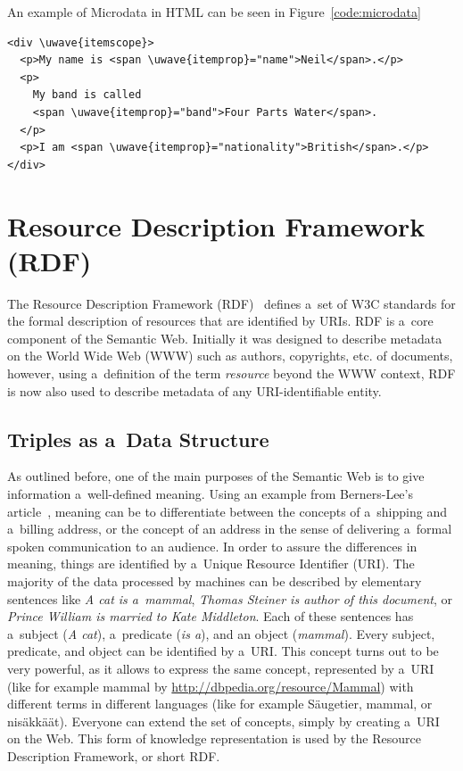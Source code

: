 An example of Microdata in HTML can be seen in Figure~\ref{code:microdata}

\begin{lstlisting}[caption={[Sample code snippet with \uwave{Microdata} mark-up.]{Sample code snippet with Microdata mark-up. Source: \url{http://www.w3.org/TR/microdata/}}},label={code:microdata}]
<div \uwave{itemscope}>
  <p>My name is <span \uwave{itemprop}="name">Neil</span>.</p>
  <p>
    My band is called
    <span \uwave{itemprop}="band">Four Parts Water</span>.
  </p>
  <p>I am <span \uwave{itemprop}="nationality">British</span>.</p>
</div>
\end{lstlisting}

\section{Resource Description Framework (RDF)} \label{sec:rdf}
The Resource Description Framework (RDF)~\cite{Klyne2004} defines
a~set of W3C standards for the formal description of resources that are identified by URIs.
RDF is a~core component of the Semantic Web.
Initially it was designed to describe metadata on the World Wide Web (WWW) such as authors,
copyrights, etc. of documents, however, using a~definition of the term \emph{resource}
beyond the WWW context, RDF is now also used to describe metadata of any URI-identifiable entity.

\subsection{Triples as a~Data Structure}
As outlined before, one of the main purposes of the Semantic Web is to give information
a~well-defined meaning.
Using an example from Berners-Lee’s article~\cite{BernersLee2001},
meaning can be to differentiate between the concepts of a~shipping and a~billing address,
or the concept of an address in the sense of delivering a~formal spoken communication to an audience.
In order to assure the differences in meaning,
things are identified by a~Unique Resource Identifier (URI).
The majority of the data processed by machines can be described by elementary sentences like
\emph{A cat is a~mammal}, \emph{Thomas Steiner is author of this document}, or
\emph{Prince William is married to Kate Middleton}.
Each of these sentences has a~subject (\emph{A cat}), a~predicate (\emph{is a}),
and an object (\emph{mammal}).
Every subject, predicate, and object can be identified by a~URI.
This concept turns out to be very powerful, as it allows to express the same concept,
represented by a~URI (like for example mammal by \url{http://dbpedia.org/resource/Mammal})
with different terms in different languages (like for example Säugetier, mammal, or nisäkkäät). 
Everyone can extend the set of concepts, simply by creating a~URI on the Web.
This form of knowledge representation is used by the Resource Description Framework, or short RDF.

